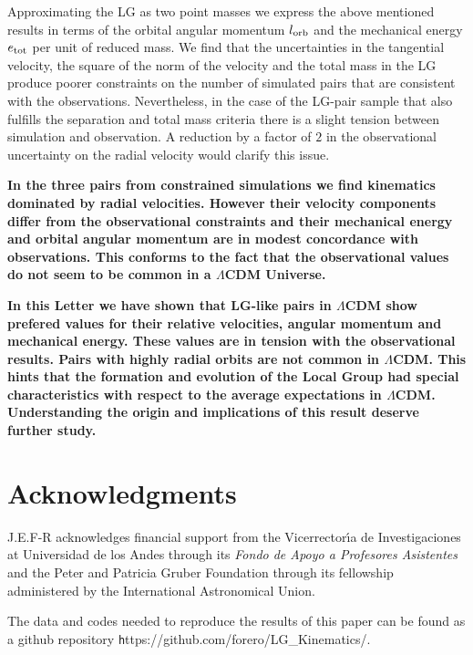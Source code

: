 \documentclass{emulateapj}
\begin{document}
Approximating the LG as two point masses we express the above mentioned results in terms of the orbital angular momentum $l_{\rm orb}$ and the mechanical energy $e_{\rm tot}$ per unit of reduced mass. We find that the uncertainties in the tangential velocity, the square of the norm of the velocity and the total mass in the LG produce poorer constraints on the number of simulated pairs that are consistent with the observations. Nevertheless, in the case of the LG-pair sample that also fulfills the separation and total mass criteria there is a slight tension between simulation and observation. A reduction by a factor of $2$ in the observational uncertainty on the radial velocity would clarify this issue.

{\bf In the three pairs from constrained simulations we find kinematics dominated by radial velocities. However their velocity components differ from the observational constraints and their mechanical energy and orbital angular momentum are in modest concordance with observations. This conforms to the fact that the observational values do not seem to be common in a $\Lambda$CDM Universe.}

{\bf In this Letter we have shown that LG-like pairs in $\Lambda$CDM show prefered values for their relative velocities, angular momentum and mechanical energy. These values are in tension with the observational results. Pairs with highly radial orbits are not common in $\Lambda$CDM. This hints that the formation and evolution of the Local Group had special characteristics with respect to the average expectations in $\Lambda$CDM. Understanding the origin and implications of this result deserve further study.}



\label{sec:conclusions}
\section*{Acknowledgments}  
J.E.F-R acknowledges financial support from the Vicerrector\'{\i}a de Investigaciones at Universidad de los Andes through its {\it Fondo de Apoyo a Profesores Asistentes} and the Peter and Patricia Gruber Foundation through its fellowship administered by the International Astronomical Union.

The data and codes needed to reproduce the results of this paper can be found as a github repository {\texttt https://github.com/forero/LG\_Kinematics/}. 


 
\end{document}
